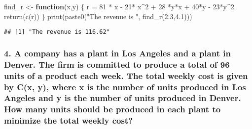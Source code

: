 \documentclass[
]{article}
\newenvironment{Shaded}{\begin{snugshade}}{\end{snugshade}}
\newcommand{\ControlFlowTok}[1]{\textcolor[rgb]{0.13,0.29,0.53}{\textbf{#1}}}
\newcommand{\DecValTok}[1]{\textcolor[rgb]{0.00,0.00,0.81}{#1}}
\newcommand{\FloatTok}[1]{\textcolor[rgb]{0.00,0.00,0.81}{#1}}
\newcommand{\FunctionTok}[1]{\textcolor[rgb]{0.00,0.00,0.00}{#1}}
\newcommand{\NormalTok}[1]{#1}
\newcommand{\OtherTok}[1]{\textcolor[rgb]{0.56,0.35,0.01}{#1}}
\newcommand{\SpecialCharTok}[1]{\textcolor[rgb]{0.00,0.00,0.00}{#1}}
\newcommand{\StringTok}[1]{\textcolor[rgb]{0.31,0.60,0.02}{#1}}
\begin{document}
\begin{Shaded}
\begin{Highlighting}[]
\NormalTok{find\_r }\OtherTok{\textless{}{-}} \ControlFlowTok{function}\NormalTok{(x,y)}
\NormalTok{  \{}
\NormalTok{   r }\OtherTok{=} \DecValTok{81} \SpecialCharTok{*}\NormalTok{ x }\SpecialCharTok{{-}} \DecValTok{21}\SpecialCharTok{*}\NormalTok{ x}\SpecialCharTok{\^{}}\DecValTok{2} \SpecialCharTok{+} \DecValTok{28} \SpecialCharTok{*}\NormalTok{y}\SpecialCharTok{*}\NormalTok{x }\SpecialCharTok{+} \DecValTok{40}\SpecialCharTok{*}\NormalTok{y  }\SpecialCharTok{{-}} \DecValTok{23}\SpecialCharTok{*}\NormalTok{y}\SpecialCharTok{\^{}}\DecValTok{2}
   \FunctionTok{return}\NormalTok{(}\FunctionTok{c}\NormalTok{(r))}
\NormalTok{  \}}
\FunctionTok{print}\NormalTok{(}\FunctionTok{paste0}\NormalTok{(}\StringTok{"The revenue is "}\NormalTok{, }\FunctionTok{find\_r}\NormalTok{(}\FloatTok{2.3}\NormalTok{,}\FloatTok{4.1}\NormalTok{)))}
\end{Highlighting}
\end{Shaded}

\begin{verbatim}
## [1] "The revenue is 116.62"
\end{verbatim}

\hypertarget{a-company-has-a-plant-in-los-angeles-and-a-plant-in-denver.-the-firm-is-committed-to-produce-a-total-of-96-units-of-a-product-each-week.-the-total-weekly-cost-is-given-by-cx-y-where-x-is-the-number-of-units-produced-in-los-angeles-and-y-is-the-number-of-units-produced-in-denver.-how-many-units-should-be-produced-in-each-plant-to-minimize-the-total-weekly-cost}{%
\subsubsection{4. A company has a plant in Los Angeles and a plant in
Denver. The firm is committed to produce a total of 96 units of a
product each week. The total weekly cost is given by C(x, y), where x is
the number of units produced in Los Angeles and y is the number of units
produced in Denver. How many units should be produced in each plant to
minimize the total weekly
cost?}\label{a-company-has-a-plant-in-los-angeles-and-a-plant-in-denver.-the-firm-is-committed-to-produce-a-total-of-96-units-of-a-product-each-week.-the-total-weekly-cost-is-given-by-cx-y-where-x-is-the-number-of-units-produced-in-los-angeles-and-y-is-the-number-of-units-produced-in-denver.-how-many-units-should-be-produced-in-each-plant-to-minimize-the-total-weekly-cost}}
\end{document}
